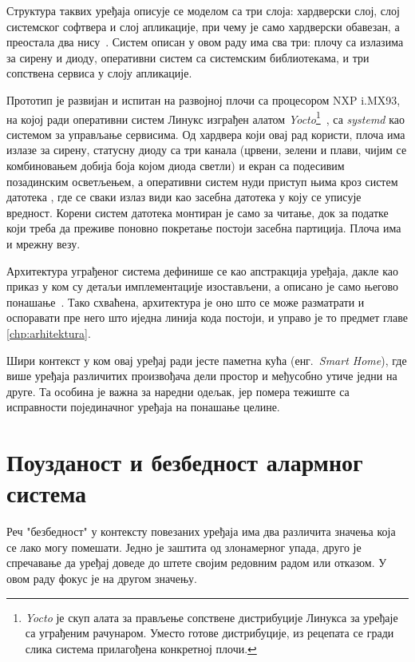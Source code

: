 \documentclass[12pt,oneside]{memoir}
\begin{document}
Структура таквих уређаја описује се моделом са три слоја: хардверски слој, слој системског
софтвера и слој апликације, при чему је само хардверски обавезан, а преостала два
нису~\cite{Noergaard2005}. Систем описан у овом раду има сва три:
плочу са излазима за сирену и диоду, оперативни систем са системским библиотекама, и три
сопствена сервиса у слоју апликације.

Прототип је развијан и испитан на развојној плочи са процесором {\lat NXP i.MX93}, на којој
ради оперативни систем Линукс изграђен алатом \emph{Yocto}\footnote{\emph{Yocto} је скуп
алата за прављење сопствене дистрибуције Линукса за уређаје са уграђеним рачунаром. Уместо
готове дистрибуције, из рецепата се гради слика система прилагођена конкретној
плочи.}~\cite{YoctoProject}, са \emph{systemd} као системом за управљање
сервисима. Од хардвера који овај рад користи, плоча има излазе за сирену, статусну диоду са
три канала (црвени, зелени и плави, чијим се комбиновањем добија боја којом диода светли)
и екран са подесивим позадинским осветљењем, а оперативни систем нуди приступ
њима кроз систем
датотека , где се сваки излаз види као засебна датотека у коју се уписује
вредност. Корени систем датотека монтиран је само за читање, док за податке који треба да
преживе поновно покретање постоји засебна партиција. Плоча има и мрежну везу.

Архитектура уграђеног система дефинише се као апстракција уређаја, дакле као приказ у ком су
детаљи имплементације изостављени, а описано је само његово понашање~\cite{Noergaard2005}.
Тако схваћена, архитектура је оно што се може разматрати и оспоравати пре него што иједна
линија кода постоји, и управо је то предмет главе \ref{chp:arhitektura}.

Шири контекст у ком овај уређај ради јесте паметна кућа (енг.\ \textit{Smart Home}), где
више уређаја различитих произвођача дели простор и међусобно утиче једни на друге. Та
особина је важна за наредни одељак, јер помера тежиште са исправности појединачног уређаја на
понашање целине.

\section{Поузданост и безбедност алармног система}
\label{sec:pouzdanost}

Реч "безбедност" у контексту повезаних уређаја има два различита значења која се лако могу
помешати.
Једно је заштита од злонамерног упада, друго је спречавање да уређај доведе до штете својим
редовним радом или отказом. У овом раду фокус је на другом значењу.
\end{document}
